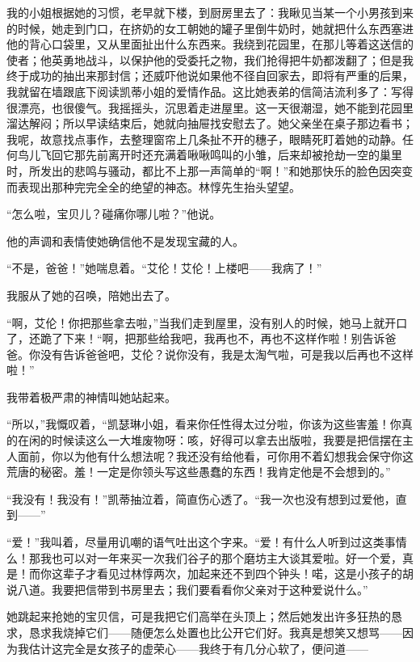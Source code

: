 \par 我的小姐根据她的习惯，老早就下楼，到厨房里去了：我瞅见当某一个小男孩到来的时候，她走到门口，在挤奶的女工朝她的罐子里倒牛奶时，她就把什么东西塞进他的背心口袋里，又从里面扯出什么东西来。我绕到花园里，在那儿等着这送信的使者；他英勇地战斗，以保护他的受委托之物，我们抢得把牛奶都泼翻了；但是我终于成功的抽出来那封信；还威吓他说如果他不径自回家去，即将有严重的后果，我就留在墙跟底下阅读凯蒂小姐的爱情作品。这比她表弟的信简洁流利多了：写得很漂亮，也很傻气。我摇摇头，沉思着走进屋里。这一天很潮湿，她不能到花园里溜达解闷；所以早读结束后，她就向抽屉找安慰去了。她父亲坐在桌子那边看书；我呢，故意找点事作，去整理窗帘上几条扯不开的穗子，眼睛死盯着她的动静。任何鸟儿飞回它那先前离开时还充满着啾啾鸣叫的小雏，后来却被抢劫一空的巢里时，所发出的悲鸣与骚动，都比不上那一声简单的“啊！”和她那快乐的脸色因突变而表现出那种完完全全的绝望的神态。林惇先生抬头望望。
\par “怎么啦，宝贝儿？碰痛你哪儿啦？”他说。
\par 他的声调和表情使她确信他不是发现宝藏的人。
\par “不是，爸爸！”她喘息着。“艾伦！艾伦！上楼吧——我病了！”
\par 我服从了她的召唤，陪她出去了。
\par “啊，艾伦！你把那些拿去啦，”当我们走到屋里，没有别人的时候，她马上就开口了，还跪了下来！“啊，把那些给我吧，我再也不，再也不这样作啦！别告诉爸爸。你没有告诉爸爸吧，艾伦？说你没有，我是太淘气啦，可是我以后再也不这样啦！”
\par 我带着极严肃的神情叫她站起来。
\par “所以，”我慨叹着，“凯瑟琳小姐，看来你任性得太过分啦，你该为这些害羞！你真的在闲的时候读这么一大堆废物呀：咳，好得可以拿去出版啦，我要是把信摆在主人面前，你以为他有什么想法呢？我还没有给他看，可你用不着幻想我会保守你这荒唐的秘密。羞！一定是你领头写这些愚蠢的东西！我肯定他是不会想到的。”
\par “我没有！我没有！”凯蒂抽泣着，简直伤心透了。“我一次也没有想到过爱他，直到——”
\par “爱！”我叫着，尽量用讥嘲的语气吐出这个字来。“爱！有什么人听到过这类事情么！那我也可以对一年来买一次我们谷子的那个磨坊主大谈其爱啦。好一个爱，真是！而你这辈子才看见过林惇两次，加起来还不到四个钟头！喏，这是小孩子的胡说八道。我要把信带到书房里去；我们要看看你父亲对于这种爱说什么。”
\par 她跳起来抢她的宝贝信，可是我把它们高举在头顶上；然后她发出许多狂热的恳求，恳求我烧掉它们——随便怎么处置也比公开它们好。我真是想笑又想骂——因为我估计这完全是女孩子的虚荣心——我终于有几分心软了，便问道——
